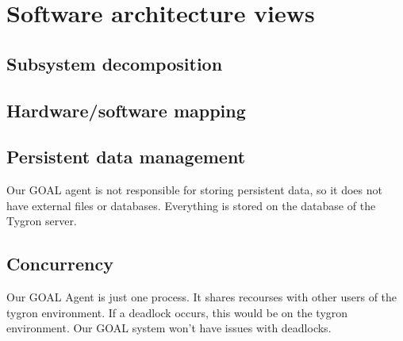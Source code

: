 \label{Software architecture views}
\section{Software architecture views}

\subsection{Subsystem decomposition}
\subsection{Hardware/software mapping}
\subsection{Persistent data management}
Our GOAL agent is not responsible for storing persistent data, so it does not have external files or databases. Everything is stored on the database of the Tygron server.
\subsection{Concurrency}
Our GOAL Agent is just one process. It shares recourses with other users of the tygron environment. If a deadlock occurs, this would be on the tygron environment. Our GOAL system won't have issues with deadlocks.
\newpage